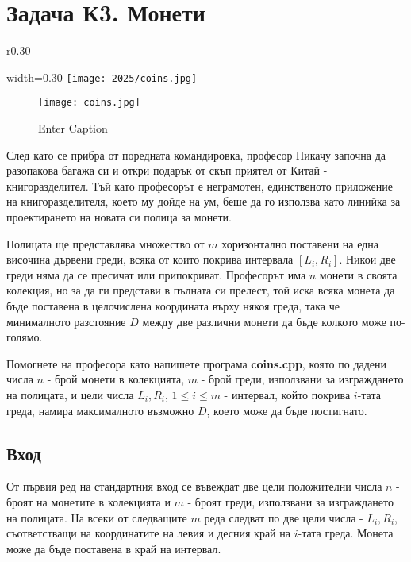 \documentclass[12pt]{article}
\begin{document}
\section{Задача К3. Монети}
\begin{wrapfigure}{r}{0.30\textwidth}
	\begin{adjustbox}{width=0.30\textwidth}
		\texttt{[image: 2025/coins.jpg]}
\begin{figure}
	    \centering
	    \texttt{[image: coins.jpg]}
	    \caption{Enter Caption}
	    \label{fig:enter-label}
	\end{figure}
		\end{adjustbox}
\end{wrapfigure}

След като се прибра от поредната командировка, професор Пикачу започна да разопакова багажа си и откри подарък от скъп приятел от Китай - книгоразделител. Тъй като професорът е неграмотен, единственото приложение на книгоразделителя, което му дойде на ум, беше да го използва като линийка за проектирането на новата си полица за монети. 

Полицата ще представлява множество от $m$ хоризонтално поставени на една височина дървени греди, всяка от които покрива интервала $[L_i, R_i]$. Никои две греди няма да се пресичат или припокриват. Професорът има $n$ монети в своята колекция, но за да ги представи в пълната си прелест, той иска всяка монета да бъде поставена в целочислена координата върху някоя греда, така че минималното разстояние $D$ между две различни монети да бъде колкото може по-голямо. 

Помогнете на професора като напишете програма \textbf{coins.cpp}, която по дадени числа $n$ - брой монети в колекцията, $m$ - брой греди, използвани за изграждането на полицата, и цели числа $L_i, R_i$, $1 \leq i \leq m$ - интервал, който покрива $i$-тата греда, намира максималното възможно $D$, което може да бъде постигнато. 

\subsection{Вход}

От първия ред на стандартния вход се въвеждат две цели положителни числа $n$ - броят
на монетите в колекцията и $m$ - броят греди, използвани за изграждането на полицата.
На всеки от следващите $m$ реда следват по две цели числа - $L_i, R_i$, съответстващи на координатите на левия и десния край на $i$-тата греда. Монета може да бъде поставена в край на интервал.
\end{document}
